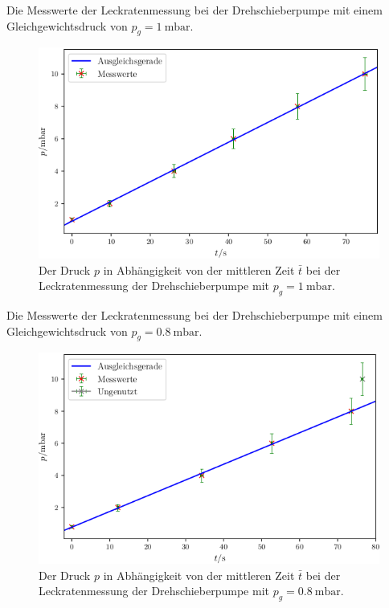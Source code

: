 \begin{table}
\centering
\caption{Die Messwerte der Leckratenmessung bei der Drehschieberpumpe mit einem Gleichgewichtsdruck von $p_g = \SI{1}{\milli\bar}$.}

\label{tab:DL1}
\end{table}

\begin{figure}
\centering
\includegraphics[width=\linewidth-70pt,height=\textheight-70pt,keepaspectratio]{content/images/DL1.png}
\caption{Der Druck $p$ in Abhängigkeit von der mittleren Zeit $\bar{t}$ bei der Leckratenmessung der Drehschieberpumpe  mit $p_g = \SI{1}{\milli\bar}$.}
\label{fig:DL1}
\end{figure}

\begin{table}
\centering
\caption{Die Messwerte der Leckratenmessung bei der Drehschieberpumpe mit einem Gleichgewichtsdruck von $p_g = \SI{0.8}{\milli\bar}$.}

\label{tab:DL2}
\end{table}

\begin{figure}
\centering
\includegraphics[width=\linewidth-70pt,height=\textheight-70pt,keepaspectratio]{content/images/DL2.png}
\caption{Der Druck $p$ in Abhängigkeit von der mittleren Zeit $\bar{t}$ bei der Leckratenmessung der Drehschieberpumpe  mit $p_g = \SI{0.8}{\milli\bar}$.}
\label{fig:DL2}
\end{figure}

